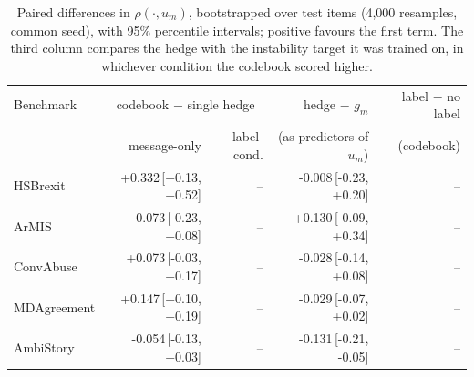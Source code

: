 \begin{table}[t]
\centering
\small
\begin{tabular}{lrrrr}
\hline
Benchmark & \multicolumn{2}{c}{codebook $-$ single hedge} & hedge $-$ $g_m$ & label $-$ no label \\
 & message-only & label-cond. & (as predictors of $u_m$) & (codebook) \\
\hline
HSBrexit & +0.332{\scriptsize\,[+0.13, +0.52]} & -- & -0.008{\scriptsize\,[-0.23, +0.20]} & -- \\
ArMIS & -0.073{\scriptsize\,[-0.23, +0.08]} & -- & +0.130{\scriptsize\,[-0.09, +0.34]} & -- \\
ConvAbuse & +0.073{\scriptsize\,[-0.03, +0.17]} & -- & -0.028{\scriptsize\,[-0.14, +0.08]} & -- \\
MDAgreement & +0.147{\scriptsize\,[+0.10, +0.19]} & -- & -0.029{\scriptsize\,[-0.07, +0.02]} & -- \\
AmbiStory & -0.054{\scriptsize\,[-0.13, +0.03]} & -- & -0.131{\scriptsize\,[-0.21, -0.05]} & -- \\
\hline
\end{tabular}
\caption{Paired differences in $\rho(\cdot,u_m)$, bootstrapped over test items (4,000 resamples, common seed), with 95\% percentile intervals; positive favours the first term. The third column compares the hedge with the instability target it was trained on, in whichever condition the codebook scored higher.}
\label{tab:paired}
\end{table}